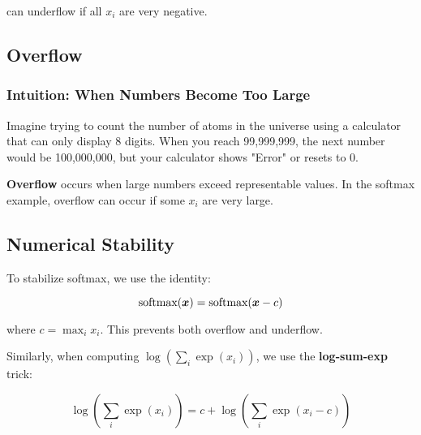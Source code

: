 can underflow if all $x_i$ are very negative.

\subsection{Overflow}

\subsubsection{Intuition: When Numbers Become Too Large}

Imagine trying to count the number of atoms in the universe using a calculator that can only display 8 digits. When you reach 99,999,999, the next number would be 100,000,000, but your calculator shows "Error" or resets to 0.

\textbf{Overflow} occurs when large numbers exceed representable values. In the softmax example, overflow can occur if some $x_i$ are very large.

\subsection{Numerical Stability}

To stabilize softmax, we use the identity:

\begin{equation}
\text{softmax}(\boldsymbol{x}) = \text{softmax}(\boldsymbol{x} - c)
\end{equation}

where $c = \max_i x_i$. This prevents both overflow and underflow.

Similarly, when computing $\log(\sum_i \exp(x_i))$, we use the \textbf{log-sum-exp} trick:

\begin{equation}
\log\left(\sum_i \exp(x_i)\right) = c + \log\left(\sum_i \exp(x_i - c)\right)
\end{equation}

